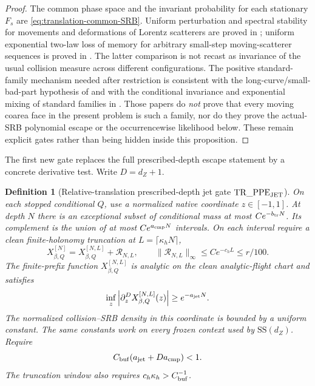 \documentclass[11pt]{article}
\newtheorem{definition}[theorem]{Definition}
\begin{document}
\begin{proof}
The common phase space and the invariant probability for each stationary
$F_s$ are \eqref{eq:translation-common-SRB}.  Uniform perturbation and
spectral stability for movements and deformations of Lorentz scatterers are
proved in \cite{DemersZhangPerturb}; uniform exponential two-law loss of
memory for arbitrary small-step moving-scatterer sequences is proved in
\cite{SYZ}.  The latter comparison is not recast as invariance of the usual
collision measure across different configurations.  The positive
standard-family mechanism needed after restriction is consistent with the
long-curve/small-bad-part hypothesis of \cite{CanestrariPerturb} and with the
conditional invariance and exponential mixing of standard families in
\cite{CanestrariHoles}.  Those papers do \emph{not} prove that every moving
coarea face in the present problem is such a family, nor do they prove the
actual-SRB polynomial escape or the occurrencewise likelihood below.  These
remain explicit gates rather than being hidden inside this proposition.
\end{proof}

The first new gate replaces the full prescribed-depth escape statement by a
concrete derivative test.  Write $D=d_Z+1$.

\begin{definition}[Relative-translation prescribed-depth jet gate
$\mathrm{TR\_PPE}_{\rm JET}$]
\label{def:translation-ppe-jet}
On each stopped conditional $Q$, use a normalized native coordinate
$z\in[-1,1]$.  At depth $N$ there is an exceptional subset of conditional
mass at most $Ce^{-b_{\rm tr}N}$.  Its complement is the union of at most
$Ce^{a_{\rm cmp}N}$ intervals.  On each interval require a clean
finite-holonomy truncation at $L=\lceil\kappa_hN\rceil$,
\begin{equation}
\label{eq:translation-finite-holonomy-truncation}
 X^{[N]}_{\beta,Q}=X^{[N,L]}_{\beta,Q}+\mathcal R_{N,L},
 \qquad \|\mathcal R_{N,L}\|_\infty\le Ce^{-c_hL}\le r/100.
\end{equation}
The finite-prefix function $X^{[N,L]}_{\beta,Q}$ is analytic on the clean
analytic-flight chart and satisfies
\begin{equation}
\label{eq:translation-ppe-derivative-gate}
 \inf_z\left|\partial_z^{D}X^{[N,L]}_{\beta,Q}(z)\right|
 \ge e^{-a_{\rm jet}N}.
\end{equation}
The normalized collision--SRB density in this coordinate is bounded by a
uniform constant.  The same constants work on every frozen context used by
$\mathrm{SS}(d_Z)$.  Require
\begin{equation}
\label{eq:translation-ppe-positive-window}
 C_{\rm buf}(a_{\rm jet}+Da_{\rm cmp})<1.
\end{equation}
The truncation window also requires $c_h\kappa_h>C_{\rm buf}^{-1}$.
\end{definition}
\end{document}
